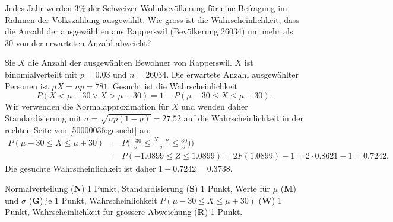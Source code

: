 Jedes Jahr werden 3\% der Schweizer Wohnbevölkerung für eine Befragung
im Rahmen der Volks\-zählung ausgewählt.
Wie gross ist die Wahrscheinlichkeit, dass die Anzahl der ausgewählten
aus Rapperswil (Bevölkerung 26034) um mehr als 30 von der erwarteten
Anzahl abweicht?


\begin{loesung}
Sie $X$ die Anzahl der ausgewählten Bewohner von Rapperswil.
$X$ ist binomialverteilt mit $p=0.03$ und $n=26034$.
Die erwartete Anzahl ausgewählter Personen ist $\mu X=np=781$.
Gesucht ist die Wahrscheinlichkeit
\begin{equation}
P(X < \mu - 30 \vee X > \mu + 30)
=
1-P(\mu - 30 \le X \le \mu + 30).
\label{50000036:gesucht}
\end{equation}
Wir verwenden die Normalapproximation für $X$ und wenden daher
Standardisierung mit $\sigma=\sqrt{np(1-p)}=27.52$ auf
die Wahrscheinlichkeit in der rechten Seite von
\eqref{50000036:gesucht}
an:
\begin{align*}
P(\mu - 30 \le X \le \mu + 30)
&=
P\biggl(
\frac{-30}{\sigma} \le \frac{X-\mu}{\sigma} \le \frac{30}{\sigma})
\biggr)
\\
&=
P(-1.0899 \le Z \le 1.0899)
=
2F(1.0899)-1
=
2\cdot 0.8621 - 1
=
0.7242.
\end{align*}
Die gesuchte Wahrscheinlichkeit ist daher $1-0.7242= 0.3738$.
\end{loesung}

\begin{bewertung}
Normalverteilung ({\bf N}) 1 Punkt,
Standardisierung ({\bf S}) 1 Punkt,
Werte für $\mu$ ({\bf M}) und $\sigma$ ({\bf G}) je 1 Punkt,
Wahrscheinlichkeit $P(\mu-30\le X\le \mu+30)$ ({\bf W}) 1 Punkt,
Wahrscheinlichkeit für grössere Abweichung ({\bf R}) 1 Punkt.
\end{bewertung}
